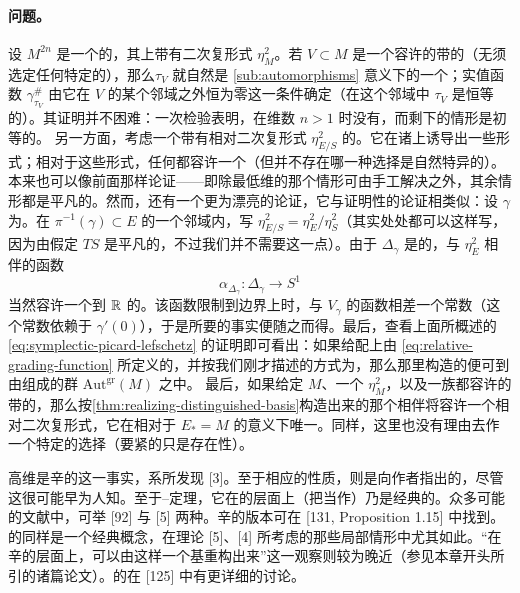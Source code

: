 \paragraph{\trGrading{}问题。}\label{sub:grading-issues}
设 $M^{2n}$ 是一个\trCorneredBoundary{}的\trExactSymplectic\trManifold，其上带有二次复\trVolume{}形式 $\eta^2_M$。若 $V\subset M$ 是一个容许\trGrading{}的带\trFrame{}的\trExact\trLagrange\trSphere（无须选定任何特定的\trGrading），那么\trDehnTwist{}$\tau_V$ 就自然是 \cref{sub:automorphisms} 意义下的一个\trGraded\trSymplectic\trAutomorphism；实值\trGrading{}函数 $\gamma^{\#}_{\tau_V}$ 由它在 $V$ 的某个邻域之外恒为零这一条件确定（在这个邻域中 $\tau_V$ 是恒等的）。其证明并不困难：一次\trCohomology{}检验表明，在维数 $n>1$ 时没有\trObstruction，而剩下的情形是初等的。
另一方面，考虑一个带有相对二次复\trVolume{}形式 $\eta^2_{E/S}$ 的\trLefschetzFibration。它在诸\trSmooth\trFiber{}上诱导出一些形式；相对于这些形式，任何\trVanishingCycle{}都容许一个\trGrading{}（但并不存在哪一种选择是自然特异的）。本来也可以像前面那样论证——即除最低维的那个情形可由手工解决之外，其余情形都是平凡的。然而，还有一个更为漂亮的论证，它与证明\trVanishingCycle{}\trExact{}性的论证相类似：设 $\gamma$ 为\trVanishingPath。在 $\pi^{-1}(\gamma)\subset E$ 的一个邻域内，写 $\eta^2_{E/S}=\eta^2_E/\eta^2_S$（其实处处都可以这样写，因为由假定 $TS$ 是平凡的，不过我们并不需要这一点）。由于 $\Delta_\gamma$ 是\trContractible{}的，与 $\eta^2_E$ 相伴的\trSquaredPhase{}函数
\begin{equation*}
\alpha_{\Delta_\gamma}\colon\Delta_\gamma\longrightarrow S^1
\end{equation*}
当然容许一个到 $\mathbb{R}$ 的\trLift。该函数限制到边界上时，与 $V_\gamma$ 的\trSquaredPhase{}函数相差一个常数（这个常数依赖于 $\gamma'(0)$），于是所要的事实便随之而得。最后，查看上面所概述的 \eqref{eq:symplectic-picard-lefschetz} 的证明即可看出：如果给\trMonodromy{}配上由 \eqref{eq:relative-grading-function} 所定义的\trGrading，并按我们刚才描述的方式为\trDehnTwist{}\trGrading，那么那里构造的\trIsotopy{}便可\trLift{}到由\trGraded\trSymplectic\trAutomorphism{}组成的群 $\mathrm{Aut}^{\mathrm{gr}}(M)$ 之中。
最后，如果给定 $M$、一个 $\eta^2_M$，以及一族都容许\trGrading{}的带\trFrame{}的\trExact\trLagrange\trSphere，那么按\cref{thm:realizing-distinguished-basis}构造出来的那个相伴\trLefschetzFibration{}将容许一个相对二次复\trVolume{}形式，它在相对于 $E_*=M$ 的\trHomotopy{}意义下唯一。同样，这里也没有理由去作一个特定的\trGrading{}选择（要紧的只是存在性）。
\begin{remark}\label{thm:dehn-twist-history-remarks}
高维\trDehnTwist{}是辛的这一事实，系\trArnold{}所发现 [3]。至于\trVanishingCycle{}相应的\trLagrange{}性质，则是\trDonaldson{}向作者指出的，尽管这很可能早为人知。至于\trPicard--\trLefschetz{}定理，它在\trTopology{}的层面上（把\trMonodromy{}当作\trDiffeomorphism）乃是经典的。众多可能的文献中，可举 [92] 与 [5] 两种。辛的版本可在 [131, Proposition 1.15] 中找到。\trVanishingCycle{}的\trDistinguishedBasis{}同样是一个经典概念，在\trSingularPoint{}理论 [5]、[4] 所考虑的那些局部情形中尤其如此。“在辛的层面上，\trTotalSpace{}可以由这样一个基重构出来”这一观察则较为晚近（参见本章开头所引的诸篇论文）。\trDehnTwist{}的\trGrading{}在 [125] 中有更详细的讨论。
\end{remark}
